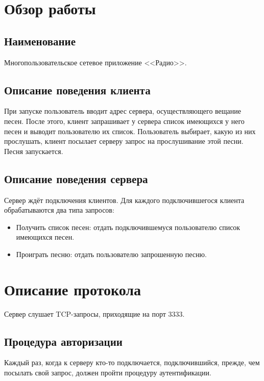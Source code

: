

\section{Обзор работы}

\subsection{Наименование}

Многопользовательское сетевое приложение <<Радио>>.

\subsection{Описание поведения клиента}

При запуске пользователь вводит адрес сервера, осуществляющего вещание
песен. После этого, клиент запрашивает у сервера список имеющихся у
него песен и выводит пользователю их список. Пользователь выбирает,
какую из них прослушать, клиент посылает серверу запрос на
прослушивание этой песни. Песня запускается.

\subsection{Описание поведения сервера}

Сервер ждёт подключения клиентов. Для каждого подключившегося клиента
обрабатываются два типа запросов:

\begin{itemize}
\item Получить список песен: отдать подключившемуся пользователю
  список имеющихся песен.
\item Проиграть песню: отдать пользователю запрошенную песню. 
\end{itemize}

\section{Описание протокола}

Сервер слушает TCP-запросы, приходящие на порт 3333.

\subsection{Процедура авторизации}

Каждый раз, когда к серверу кто-то подключается, подключившийся,
прежде, чем посылать свой запрос, должен пройти процедуру
аутентификации. 

